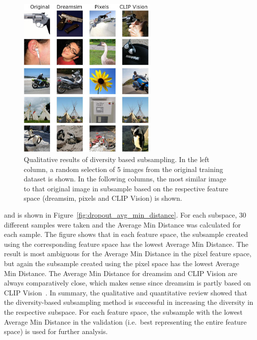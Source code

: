 \begin{figure}[ht]
  \centering
  \includegraphics[width=0.6\textwidth]{plots/dropout_similarity_plot.JPEG}
  \caption[Qualitative results of diversity based subsampling]{Qualitative results of diversity based subsampling. In the left column, a random selection of 5 images from the original training dataset is shown. In the following columns, the most similar image to that original image in subsample based on the respective feature space (dreamsim, pixels and CLIP Vision) is shown.}\label{fig:dropout_similarity_plot}
\end{figure}

and is shown in Figure~\ref{fig:dropout_avg_min_distance}. For each subspace, 30 different samples were taken and the Average Min Distance was calculated for each sample. The figure shows that in each feature space, the subsample created using the corresponding feature space has the lowest Average Min Distance. The result is most ambiguous for the Average Min Distance in the pixel feature space, but again the subsample created using the pixel space has the lowest Average Min Distance. The Average Min Distance for dreamsim and CLIP Vision are always comparatively close, which makes sense since dreamsim is partly based on CLIP Vision~\cite{fuDreamSimLearningNew2023}. In summary, the qualitative and quantitative review showed that the diversity-based subsampling method is successful in increasing the diversity in the respective subspace. For each feature space, the subsample with the lowest Average Min Distance in the validation (i.e.\ best representing the entire feature space) is used for further analysis.

